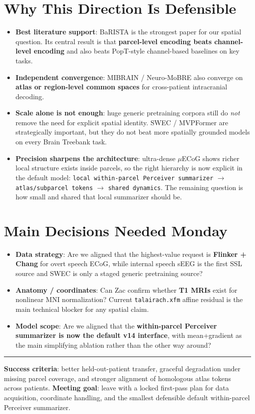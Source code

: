 \documentclass[10pt,letterpaper]{article}
\begin{document}
\section{Why This Direction Is Defensible}

\begin{itemize}
\item \textbf{Best literature support}: BaRISTA is the strongest paper for our spatial question. Its central result is that \textbf{parcel-level encoding beats channel-level encoding} and also beats PopT-style channel-based baselines on key tasks.
\item \textbf{Independent convergence}: MIBRAIN / Neuro-MoBRE also converge on \textbf{atlas or region-level common spaces} for cross-patient intracranial decoding.
\item \textbf{Scale alone is not enough}: huge generic pretraining corpora still do \emph{not} remove the need for explicit spatial identity. SWEC / MVPFormer are strategically important, but they do not beat more spatially grounded models on every Brain Treebank task.
\item \textbf{Precision sharpens the architecture}: ultra-dense $\mu$ECoG shows richer local structure exists inside parcels, so the right hierarchy is now explicit in the default model: \texttt{local within-parcel Perceiver summarizer} $\rightarrow$ \texttt{atlas/subparcel tokens} $\rightarrow$ \texttt{shared dynamics}. The remaining question is how small and shared that local summarizer should be.
\end{itemize}

\section{Main Decisions Needed Monday}

\begin{itemize}
\item \textbf{Data strategy}: Are we aligned that the highest-value request is \textbf{Flinker + Chang} for overt speech ECoG, while internal speech sEEG is the first SSL source and SWEC is only a staged generic pretraining source?
\item \textbf{Anatomy / coordinates}: Can Zac confirm whether \textbf{T1 MRIs} exist for nonlinear MNI normalization? Current \texttt{talairach.xfm} affine residual is the main technical blocker for any spatial claim.
\item \textbf{Model scope}: Are we aligned that the \textbf{within-parcel Perceiver summarizer is now the default v14 interface}, with mean+gradient as the main simplifying ablation rather than the other way around?
\end{itemize}

\vfill
\hrule
\smallskip
{\small \textbf{Success criteria}: better held-out-patient transfer, graceful degradation under missing parcel coverage, and stronger alignment of homologous atlas tokens across patients. \textbf{Meeting goal}: leave with a locked first-pass plan for data acquisition, coordinate handling, and the smallest defensible default within-parcel Perceiver summarizer.}
\end{document}
